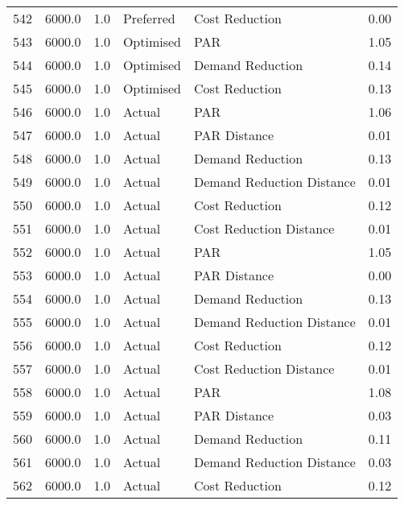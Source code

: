 \begin{longtable}{lrrllr}
542  &       6000.0 &     1.0 &      Preferred &             Cost Reduction &   0.00 \\
543  &       6000.0 &     1.0 &      Optimised &                        PAR &   1.05 \\
544  &       6000.0 &     1.0 &      Optimised &           Demand Reduction &   0.14 \\
545  &       6000.0 &     1.0 &      Optimised &             Cost Reduction &   0.13 \\
546  &       6000.0 &     1.0 &         Actual &                        PAR &   1.06 \\
547  &       6000.0 &     1.0 &         Actual &               PAR Distance &   0.01 \\
548  &       6000.0 &     1.0 &         Actual &           Demand Reduction &   0.13 \\
549  &       6000.0 &     1.0 &         Actual &  Demand Reduction Distance &   0.01 \\
550  &       6000.0 &     1.0 &         Actual &             Cost Reduction &   0.12 \\
551  &       6000.0 &     1.0 &         Actual &    Cost Reduction Distance &   0.01 \\
552  &       6000.0 &     1.0 &         Actual &                        PAR &   1.05 \\
553  &       6000.0 &     1.0 &         Actual &               PAR Distance &   0.00 \\
554  &       6000.0 &     1.0 &         Actual &           Demand Reduction &   0.13 \\
555  &       6000.0 &     1.0 &         Actual &  Demand Reduction Distance &   0.01 \\
556  &       6000.0 &     1.0 &         Actual &             Cost Reduction &   0.12 \\
557  &       6000.0 &     1.0 &         Actual &    Cost Reduction Distance &   0.01 \\
558  &       6000.0 &     1.0 &         Actual &                        PAR &   1.08 \\
559  &       6000.0 &     1.0 &         Actual &               PAR Distance &   0.03 \\
560  &       6000.0 &     1.0 &         Actual &           Demand Reduction &   0.11 \\
561  &       6000.0 &     1.0 &         Actual &  Demand Reduction Distance &   0.03 \\
562  &       6000.0 &     1.0 &         Actual &             Cost Reduction &   0.12 \\

\end{longtable}
